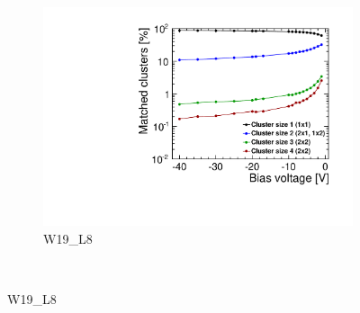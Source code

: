 \begin{figure}[htbp]
\begin{subfigure}[b]{0.33\textwidth}
    \includegraphics[width=\textwidth]{./figures/TestBeam/cluSize_biasScan_W0019_L08.pdf}
    \caption{W19\_L8}
  \end{subfigure} \\


\end{figure}
